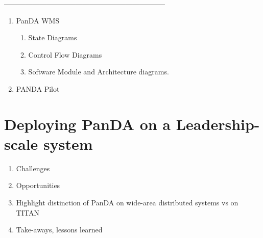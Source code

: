 \documentclass[10pt, conference, compsocconf]{IEEEtran}
\begin{document}
--------------------------------------------------------------------
\begin{enumerate}
  \item PanDA WMS
  \begin{enumerate}
    \item State Diagrams
    \item Control Flow Diagrams
    \item Software Module and Architecture diagrams.
  \end{enumerate}
  \item PANDA Pilot
\end{enumerate}



\section{Deploying PanDA on a Leadership-scale system}
\label{sec:panda_deployment}

\begin{enumerate}
  \item Challenges
  \item Opportunities
  \item Highlight distinction of PanDA on wide-area distributed systems vs on TITAN
  \item Take-aways, lessons learned
\end{enumerate}



%


\end{document}
